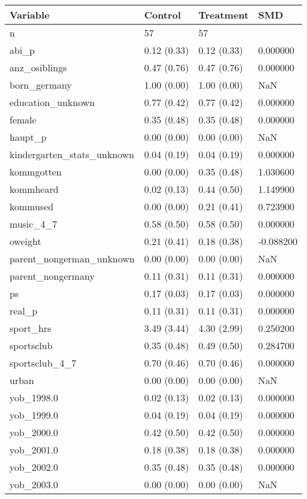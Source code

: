 \begin{tabular}{llll}
\toprule
Variable & Control & Treatment & SMD \\
\midrule
n & 57 & 57 &  \\
abi\_p & 0.12 (0.33) & 0.12 (0.33) & 0.000000 \\
anz\_osiblings & 0.47 (0.76) & 0.47 (0.76) & 0.000000 \\
born\_germany & 1.00 (0.00) & 1.00 (0.00) & NaN \\
education\_unknown & 0.77 (0.42) & 0.77 (0.42) & 0.000000 \\
female & 0.35 (0.48) & 0.35 (0.48) & 0.000000 \\
haupt\_p & 0.00 (0.00) & 0.00 (0.00) & NaN \\
kindergarten\_stats\_unknown & 0.04 (0.19) & 0.04 (0.19) & 0.000000 \\
kommgotten & 0.00 (0.00) & 0.35 (0.48) & 1.030600 \\
kommheard & 0.02 (0.13) & 0.44 (0.50) & 1.149900 \\
kommused & 0.00 (0.00) & 0.21 (0.41) & 0.723900 \\
music\_4\_7 & 0.58 (0.50) & 0.58 (0.50) & 0.000000 \\
oweight & 0.21 (0.41) & 0.18 (0.38) & -0.088200 \\
parent\_nongerman\_unknown & 0.00 (0.00) & 0.00 (0.00) & NaN \\
parent\_nongermany & 0.11 (0.31) & 0.11 (0.31) & 0.000000 \\
ps & 0.17 (0.03) & 0.17 (0.03) & 0.000000 \\
real\_p & 0.11 (0.31) & 0.11 (0.31) & 0.000000 \\
sport\_hrs & 3.49 (3.44) & 4.30 (2.99) & 0.250200 \\
sportsclub & 0.35 (0.48) & 0.49 (0.50) & 0.284700 \\
sportsclub\_4\_7 & 0.70 (0.46) & 0.70 (0.46) & 0.000000 \\
urban & 0.00 (0.00) & 0.00 (0.00) & NaN \\
yob\_1998.0 & 0.02 (0.13) & 0.02 (0.13) & 0.000000 \\
yob\_1999.0 & 0.04 (0.19) & 0.04 (0.19) & 0.000000 \\
yob\_2000.0 & 0.42 (0.50) & 0.42 (0.50) & 0.000000 \\
yob\_2001.0 & 0.18 (0.38) & 0.18 (0.38) & 0.000000 \\
yob\_2002.0 & 0.35 (0.48) & 0.35 (0.48) & 0.000000 \\
yob\_2003.0 & 0.00 (0.00) & 0.00 (0.00) & NaN \\
\bottomrule
\end{tabular}
